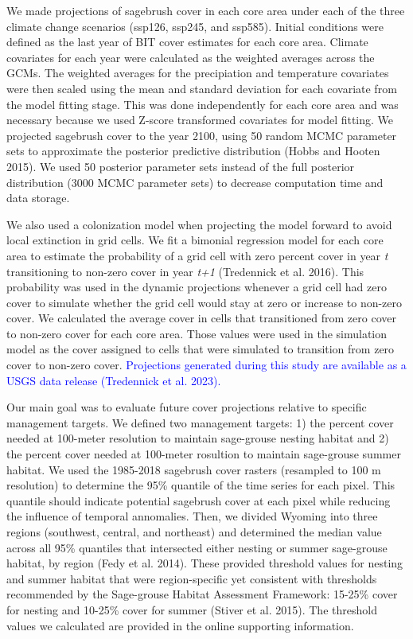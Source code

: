 \documentclass[
  12pt,
]{article}
\begin{document}
We made projections of sagebrush cover in each core area under each of the three climate change scenarios (ssp126, ssp245, and ssp585).
Initial conditions were defined as the last year of BIT cover estimates for each core area.
Climate covariates for each year were calculated as the weighted averages across the GCMs.
The weighted averages for the precipiation and temperature covariates were then scaled using the mean and standard deviation for each covariate from the model fitting stage.
This was done independently for each core area and was necessary because we used Z-score transformed covariates for model fitting.
We projected sagebrush cover to the year 2100, using 50 random MCMC parameter sets to approximate the posterior predictive distribution (Hobbs and Hooten 2015).
We used 50 posterior parameter sets instead of the full posterior distribution (3000 MCMC parameter sets) to decrease computation time and data storage.

We also used a colonization model when projecting the model forward to avoid local extinction in grid cells.
We fit a bimonial regression model for each core area to estimate the probability of a grid cell with zero percent cover in year \emph{t} transitioning to non-zero cover in year \emph{t+1} (Tredennick et al. 2016).
This probability was used in the dynamic projections whenever a grid cell had zero cover to simulate whether the grid cell would stay at zero or increase to non-zero cover.
We calculated the average cover in cells that transitioned from zero cover to non-zero cover for each core area.
Those values were used in the simulation model as the cover assigned to cells that were simulated to transition from zero cover to non-zero cover.
\textcolor{blue}{Projections generated during this study are available as a USGS data release (Tredennick et al. 2023).}

Our main goal was to evaluate future cover projections relative to specific management targets.
We defined two management targets: 1) the percent cover needed at 100-meter resolution to maintain sage-grouse nesting habitat and 2) the percent cover needed at 100-meter rosultion to maintain sage-grouse summer habitat.
We used the 1985-2018 sagebrush cover rasters (resampled to 100 m resolution) to determine the 95\% quantile of the time series for each pixel.
This quantile should indicate potential sagebrush cover at each pixel while reducing the influence of temporal annomalies.
Then, we divided Wyoming into three regions (southwest, central, and northeast) and determined the median value across all 95\% quantiles that intersected either nesting or summer sage-grouse habitat, by region (Fedy et al. 2014).
These provided threshold values for nesting and summer habitat that were region-specific yet consistent with thresholds recommended by the Sage-grouse Habitat Assessment Framework: 15-25\% cover for nesting and 10-25\% cover for summer (Stiver et al. 2015).
The threshold values we calculated are provided in the online supporting information.
\end{document}
